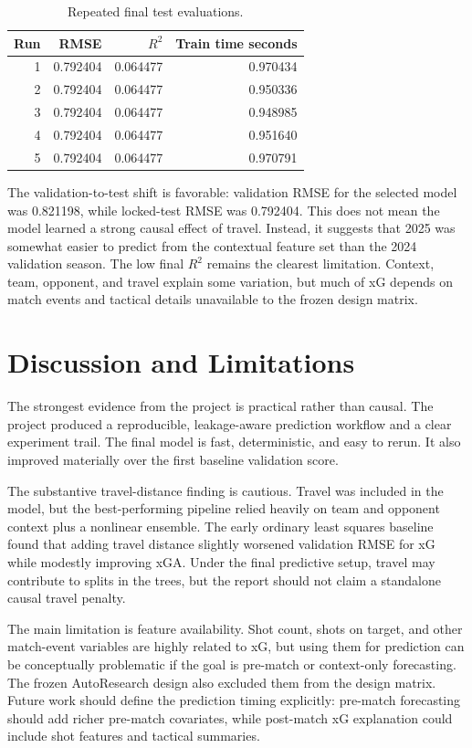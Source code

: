 \documentclass{article}
\begin{document}
\begin{table}[h]
\centering
\caption{Repeated final test evaluations.}
\begin{tabular}{rrrr}
\toprule
Run & RMSE & $R^2$ & Train time seconds \\
\midrule
1 & 0.792404 & 0.064477 & 0.970434 \\
2 & 0.792404 & 0.064477 & 0.950336 \\
3 & 0.792404 & 0.064477 & 0.948985 \\
4 & 0.792404 & 0.064477 & 0.951640 \\
5 & 0.792404 & 0.064477 & 0.970791 \\
\bottomrule
\end{tabular}
\end{table}

The validation-to-test shift is favorable: validation RMSE for the selected model was 0.821198, while locked-test RMSE was 0.792404. This does not mean the model learned a strong causal effect of travel. Instead, it suggests that 2025 was somewhat easier to predict from the contextual feature set than the 2024 validation season. The low final $R^2$ remains the clearest limitation. Context, team, opponent, and travel explain some variation, but much of xG depends on match events and tactical details unavailable to the frozen design matrix.

\clearpage
\section{Discussion and Limitations}
The strongest evidence from the project is practical rather than causal. The project produced a reproducible, leakage-aware prediction workflow and a clear experiment trail. The final model is fast, deterministic, and easy to rerun. It also improved materially over the first baseline validation score.

The substantive travel-distance finding is cautious. Travel was included in the model, but the best-performing pipeline relied heavily on team and opponent context plus a nonlinear ensemble. The early ordinary least squares baseline found that adding travel distance slightly worsened validation RMSE for xG while modestly improving xGA. Under the final predictive setup, travel may contribute to splits in the trees, but the report should not claim a standalone causal travel penalty.

The main limitation is feature availability. Shot count, shots on target, and other match-event variables are highly related to xG, but using them for prediction can be conceptually problematic if the goal is pre-match or context-only forecasting. The frozen AutoResearch design also excluded them from the design matrix. Future work should define the prediction timing explicitly: pre-match forecasting should add richer pre-match covariates, while post-match xG explanation could include shot features and tactical summaries.
\end{document}
